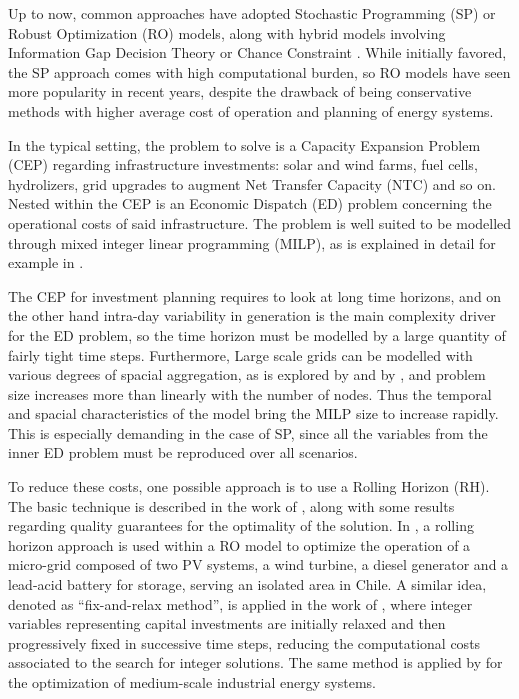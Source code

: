 \documentclass[smallextended,natbib]{svjour3}       %
\numberwithin{definition}{section}
\numberwithin{theorem}{section}
\numberwithin{proposition}{section}
\begin{document}
Up to now, common approaches have adopted Stochastic Programming (SP) or Robust Optimization (RO) models, along with hybrid
 models involving Information Gap Decision Theory or Chance Constraint \citep{review_math_opt}. 
While initially favored, the SP approach comes with high computational burden, so RO models have seen more popularity 
in recent years, despite the drawback of being conservative methods with higher average cost of operation and planning of energy systems.

In the typical setting, the problem to solve is a Capacity Expansion Problem (CEP) regarding infrastructure investments:
 solar and wind farms, fuel cells, hydrolizers, grid upgrades to augment Net Transfer Capacity (NTC) and so on. 
Nested within the CEP is an Economic Dispatch (ED) problem concerning the operational costs of said infrastructure. 
The problem is well suited to be modelled through mixed integer linear programming (MILP), as is explained in detail for example in 
\citet{INTRO_isolated_MIP}.%

The CEP for investment planning requires to look at long time horizons, and on the other hand intra-day variability in generation is the main complexity driver for the ED problem, so the time horizon must be modelled by a large quantity of fairly tight time steps. 
Furthermore, Large scale grids can be modelled with various degrees of spacial aggregation, as is explored by \citet{Horsch} and by \citet{BIENER2020106349}, and problem size increases more than linearly with the number of nodes.
Thus the temporal and spacial characteristics of the model bring the MILP size to increase rapidly. 
This is especially demanding in the case of SP, since all the variables from the inner ED problem must be reproduced over all scenarios.

To reduce these costs, one possible approach is to use a Rolling Horizon (RH). 
The basic technique is described in the work of \citet{INTRO_Glomb}, along with some results regarding quality guarantees for the optimality of the solution. 
In \citet{INTRO_Palma-Behnke}, a rolling horizon approach is used within a RO model to optimize the operation of a micro-grid composed of two PV systems, a wind turbine, a diesel generator and a lead-acid battery for storage, serving an isolated area in Chile. 
A similar idea, denoted as ``fix-and-relax method'', is applied in the work of \citet{INTRO_karlsruhe}, 
where integer variables representing capital investments are initially relaxed 
and then progressively fixed in successive time steps, reducing the computational
 costs associated to the search for integer solutions. The same method is applied by \citet{papero_bin} for the optimization of medium-scale industrial energy systems.
\end{document}
